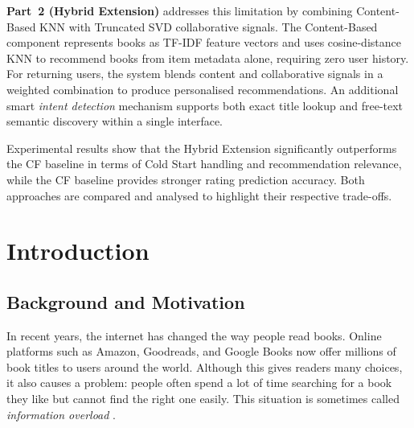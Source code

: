 \documentclass[12pt, a4paper]{article}
\begin{document}
\textbf{Part~2 (Hybrid Extension)} addresses this limitation by combining
Content-Based KNN with Truncated SVD collaborative signals.
The Content-Based component represents books as TF-IDF feature vectors and
uses cosine-distance KNN to recommend books from item metadata alone,
requiring zero user history.
For returning users, the system blends content and collaborative signals in a
weighted combination to produce personalised recommendations.
An additional smart \textit{intent detection} mechanism supports both
exact title lookup and free-text semantic discovery within a single interface.

Experimental results show that the Hybrid Extension significantly outperforms
the CF baseline in terms of Cold Start handling and recommendation relevance,
while the CF baseline provides stronger rating prediction accuracy.
Both approaches are compared and analysed to highlight their respective trade-offs.

\newpage
\thispagestyle{fancy}
\tableofcontents

\newpage
\thispagestyle{fancy}
\listoffigures
{}
\listoftables
{}

\newpage
\section{Introduction}

\subsection{Background and Motivation}

In recent years, the internet has changed the way people read books.
Online platforms such as Amazon, Goodreads, and Google Books now offer millions of book titles to users around the world.
Although this gives readers many choices, it also causes a problem: people often spend a lot of time searching for a book they like but cannot find the right one easily.
This situation is sometimes called \textit{information overload} \cite{resnick1994}.
\end{document}
